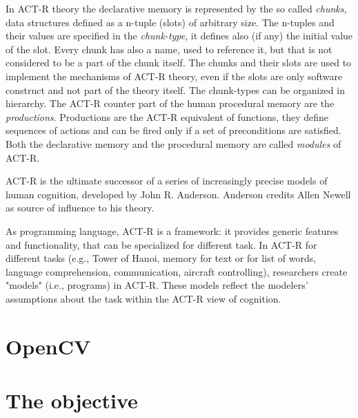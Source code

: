 In ACT-R theory the declarative memory is represented by the so called \emph{chunks}, data structures defined as a n-tuple (slots) of arbitrary size. The n-tuples and their values are specified in the \emph{chunk-type}, it defines also (if any) the initial value of the slot. Every chunk has also a name, used to reference it, but that is not considered to be a part of the chunk itself. The chunks and their slots are used to implement the mechanisms of ACT-R theory, even if the slots are only software construct and not part of the theory itself. The chunk-types can be organized in hierarchy.
The ACT-R counter part of the human procedural memory are the \emph{productions}. Productions are the ACT-R equivalent of functions, they define sequences of actions and can be fired only if a set of preconditions are satisfied. 
Both the declarative memory and the procedural memory are called \emph{modules} of ACT-R. 

ACT-R is the ultimate successor of a series of increasingly precise models of human cognition, developed by John R. Anderson. Anderson credits Allen Newell as source of influence to his theory.


As programming language, ACT-R is a framework: it provides generic features and functionality, that can be specialized for different task. In ACT-R for different tasks 
(e.g., Tower of Hanoi, memory for text or for list of words, language comprehension, 
communication, aircraft controlling), researchers create "models" (i.e., programs) in ACT-R. 
These models reflect the modelers' assumptions about the task within the ACT-R view of 
cognition.
\section{OpenCV}
\section{The objective}